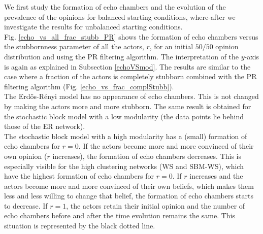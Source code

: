 \documentclass[11 pt , letterpaper , twoside , openright]{book}
\begin{document}
\newline
We first study the formation of echo chambers and the evolution of the prevalence of the opinions for balanced starting conditions, where-after we investigate the results for unbalanced starting conditions.\\
\newline
Fig. \ref{echo_vs_all_frac_stubb_PR} shows the formation of echo chambers versus the stubbornness parameter of all the actors, $r$, for an initial $50/50$ opinion distribution and using the PR filtering algorithm. The interpretation of the $y$-axis is again as explained in Subsection \ref{echoVSmod}. The results are similar to the case where a fraction of the actors is completely stubborn combined with the PR filtering algorithm (Fig. \ref{echo_vs_frac_complStubb}).\\
\newline
The Erd\H{o}s-R\'{e}nyi model has no appearance of echo chambers. This is not changed by making the actors more and more stubborn. The same result is obtained for the stochastic block model with a low modularity (the data points lie behind those of the ER network).\\
\newline
The stochastic block model with a high modularity has a (small) formation of echo chambers for $r=0$. If the actors become more and more convinced of their own opinion ($r$ increases), the formation of echo chambers decreases. This is especially visible for the high clustering networks (WS and SBM-WS), which have the highest formation of echo chambers for $r=0$. If $r$ increases and the actors become more and more convinced of their own beliefs, which makes them less and less willing to change that belief, the formation of echo chambers starts to decrease. If $r=1$, the actors retain their initial opinion and the number of echo chambers before and after the time evolution remains the same. This situation is represented by the black dotted line.
\end{document}
